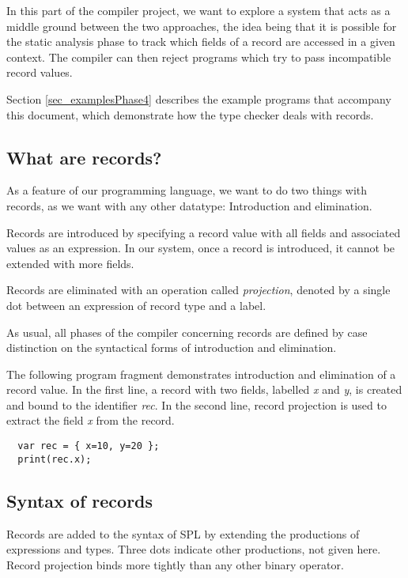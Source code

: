 \documentclass[a4paper]{article}
\begin{document}
In this part of the compiler project, we want to explore a system that acts as
a middle ground between the two approaches, the idea being that it
is possible for the static analysis phase to track which fields of a record are
accessed in a given context.  The compiler can then reject programs which try to
pass incompatible record values.

Section \ref{sec_examplesPhase4} describes the example programs that accompany
this document, which demonstrate how the type checker deals with records.

\subsection{What are records?}

As a feature of our programming language, we want to do two things with records,
as we want with any other datatype: Introduction and elimination.

Records are introduced by specifying a record value with all fields and
associated values as an expression.  In our system, once a record is introduced,
it cannot be extended with more fields.

Records are eliminated with an operation called \emph{projection}, denoted by a
single dot between an expression of record type and a label.

As usual, all phases of the compiler concerning records are defined by case
distinction on the syntactical forms of introduction and elimination.

The following program fragment demonstrates introduction and elimination of a
record value.  In the first line, a record with two fields, labelled \emph{x}
and \emph{y}, is created and bound to the identifier \emph{rec}.  In the second
line, record projection is used to extract the field \emph{x} from the record.

\begin{verbatim}
  var rec = { x=10, y=20 };
  print(rec.x);
\end{verbatim}

\subsection{Syntax of records}

Records are added to the syntax of SPL by extending the productions of
expressions and types.  Three dots indicate other productions, not given here.
Record projection binds more tightly than any other binary operator.
\end{document}
